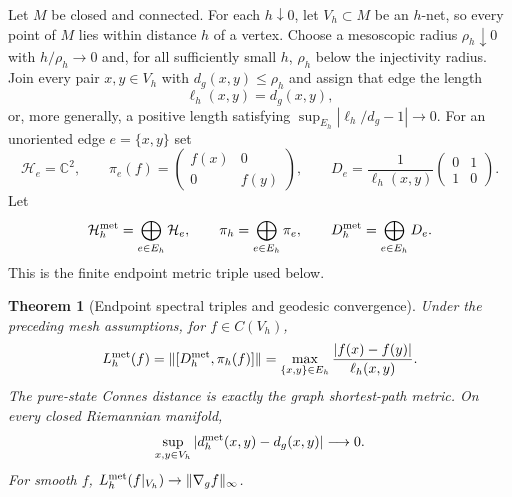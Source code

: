 \documentclass[11pt]{article}
\newtheorem{theorem}{Theorem}[section]
\theoremstyle{definition}
\theoremstyle{remark}
\theoremstyle{definition}
\theoremstyle{remark}
\newcommand{\C}{\mathbb C}
\newcommand{\Hh}{\mathcal H}
\begin{document}
Let $M$ be closed and connected.  For each $h\downarrow0$, let $V_h\subset M$ be an $h$-net,
so every point of $M$ lies within distance $h$ of a vertex.  Choose a mesoscopic
radius $\rho_h\downarrow0$ with $h/\rho_h\to0$ and, for all sufficiently small
$h$, $\rho_h$ below the injectivity radius.  Join every pair
$x,y\in V_h$ with $d_g(x,y)\le\rho_h$ and assign that edge the length
\begin{equation}
 \ell_h(x,y)=d_g(x,y),
 \label{eq:supp-metric-edge-length}
\end{equation}
or, more generally, a positive length satisfying
$\sup_{E_h}|\ell_h/d_g-1|\to0$.  For an unoriented edge $e=\{x,y\}$ set
\begin{equation}
 \Hh_e=\C^2,\qquad
 \pi_e(f)=\begin{pmatrix}f(x)&0\\0&f(y)\end{pmatrix},\qquad
 D_e=\frac1{\ell_h(x,y)}\begin{pmatrix}0&1\\1&0\end{pmatrix}.
 \label{eq:supp-endpoint-block}
\end{equation}
Let
\begin{equation}
 \Hh_h^{\rm met}=\bigoplus_{e\in E_h}\Hh_e,\qquad
 \pi_h=\bigoplus_{e\in E_h}\pi_e,\qquad
 D_h^{\rm met}=\bigoplus_{e\in E_h}D_e.
 \label{eq:supp-endpoint-triple}
\end{equation}
This is the finite endpoint metric triple used below.

\begin{theorem}[Endpoint spectral triples and geodesic convergence]
\label{thm:supp-global-metric}
Under the preceding mesh assumptions, for $f\in C(V_h)$,
\begin{equation}
{
L_h^{\rm met}(f)
=\|[D_h^{\rm met},\pi_h(f)]\|
=\max_{\{x,y\}\in E_h}\frac{|f(x)-f(y)|}{\ell_h(x,y)}.}
\label{eq:supp-edge-lip}
\end{equation}
The pure-state Connes distance is exactly the graph shortest-path metric.  On every
closed Riemannian manifold,
\begin{equation}
{
\sup_{x,y\in V_h}
|d_h^{\rm met}(x,y)-d_g(x,y)|\longrightarrow0.}
\label{eq:supp-global-metric-convergence}
\end{equation}
For smooth $f$, $L_h^{\rm met}(f|_{V_h})\to\|\nabla_gf\|_\infty$.
\end{theorem}
\end{document}
